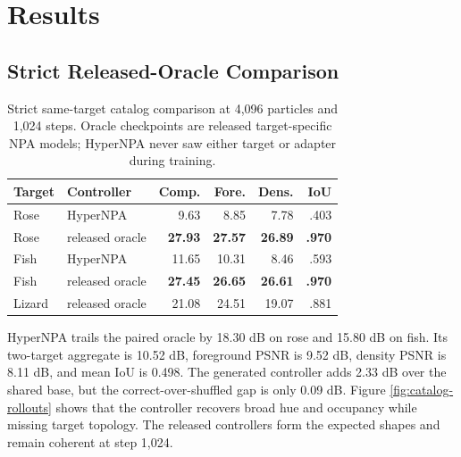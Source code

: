 \documentclass[sigconf,nonacm]{acmart}
\begin{document}
\section{Results}

\subsection{Strict Released-Oracle Comparison}

\begin{table}[t]
\caption{Strict same-target catalog comparison at 4,096 particles and 1,024
steps. Oracle checkpoints are released target-specific NPA models; HyperNPA
never saw either target or adapter during training.}
\label{tab:catalog}
\centering
\small
\begin{tabular}{llrrrr}
\toprule
Target & Controller & Comp. & Fore. & Dens. & IoU \\
\midrule
Rose & HyperNPA & 9.63 & 8.85 & 7.78 & .403 \\
Rose & released oracle & \textbf{27.93} & \textbf{27.57} & \textbf{26.89} & \textbf{.970} \\
Fish & HyperNPA & 11.65 & 10.31 & 8.46 & .593 \\
Fish & released oracle & \textbf{27.45} & \textbf{26.65} & \textbf{26.61} & \textbf{.970} \\
\midrule
Lizard & released oracle & 21.08 & 24.51 & 19.07 & .881 \\
\bottomrule
\end{tabular}
\end{table}

HyperNPA trails the paired oracle by 18.30 dB on rose and 15.80 dB on fish.
Its two-target aggregate is 10.52 dB, foreground PSNR is 9.52 dB, density PSNR
is 8.11 dB, and mean IoU is 0.498. The generated controller adds 2.33 dB over
the shared base, but the correct-over-shuffled gap is only 0.09 dB. Figure
\ref{fig:catalog-rollouts} shows that the controller recovers broad hue and
occupancy while missing target topology. The released controllers form the
expected shapes and remain coherent at step 1,024.
\end{document}
